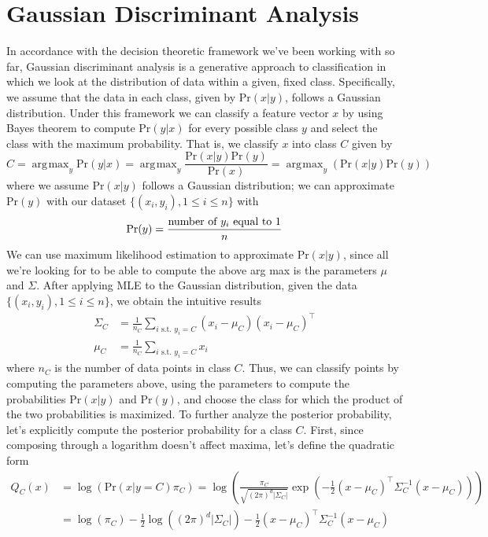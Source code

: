 \documentclass{article}
\DeclareMathOperator*{\argmax}{\arg\!\max}
\begin{document}
\section{Gaussian Discriminant Analysis}
In accordance with the decision theoretic framework we've been working with so far, Gaussian discriminant analysis is a generative approach to classification in which we look at the distribution of data within a given, fixed class. Specifically, we assume that the data in each class, given by $ \text{Pr}(x | y) $, follows a Gaussian distribution. Under this framework we can classify a feature vector $ x $ by using Bayes theorem to compute $ \text{Pr}(y | x) $ for every possible class $ y $ and select the class with the maximum probability. That is, we classify $ x $ into class $ C $ given by
$$ C = \argmax_y \text{Pr}(y | x) = \argmax_y \frac{\text{Pr}(x | y) \text{Pr}(y)}{\text{Pr}(x)} = \argmax_y (\text{Pr}(x | y) \text{Pr}(y)) $$
where we assume $ \text{Pr}(x | y) $ follows a Gaussian distribution; we can approximate $ \text{Pr}(y) $ with our dataset $ \{ (x_i, y_i), 1 \leq i \leq n \} $ with
$$ \text{Pr}(y) = \frac{\text{number of $ y_i $ equal to 1}}{n} $$
We can use maximum likelihood estimation to approximate $ \text{Pr}(x | y) $, since all we're looking for to be able to compute the above arg max is the parameters $ \mu $ and $ \Sigma $. After applying MLE to the Gaussian distribution, given the data $ \{ (x_i, y_i), 1 \leq i \leq n \} $, we obtain the intuitive results
$$ \begin{aligned}
	\Sigma_C &= \frac{1}{n_C} \sum_{i \text{ s.t. } y_i = C} (x_i - \mu_C)(x_i - \mu_C)^\intercal \\
	\mu_C &= \frac{1}{n_C} \sum_{i \text{ s.t. } y_i = C} x_i
\end{aligned} $$
where $ n_C $ is the number of data points in class $ C $. Thus, we can classify points by computing the parameters above, using the parameters to compute the probabilities $ \text{Pr}(x | y) $ and $ \text{Pr}(y) $, and choose the class for which the product of the two probabilities is maximized.
\newline
To further analyze the posterior probability, let's explicitly compute the posterior probability for a class $ C $. First, since composing through a logarithm doesn't affect maxima, let's define the quadratic form
$$ \begin{aligned}
	Q_C (x) &= \log(\text{Pr}(x | y = C) \pi_C) = \log \left( \frac{\pi_C}{\sqrt{(2 \pi)^d | \Sigma_C |}} \exp \left(- \frac{1}{2} (x - \mu_C)^\intercal \Sigma_C^{-1} (x - \mu_C) \right) \right) \\
	&= \log(\pi_C) - \frac{1}{2} \log( (2 \pi)^d | \Sigma_C |) - \frac{1}{2} (x - \mu_C)^\intercal \Sigma_C^{-1} (x - \mu_C)
\end{aligned} $$
\end{document}
